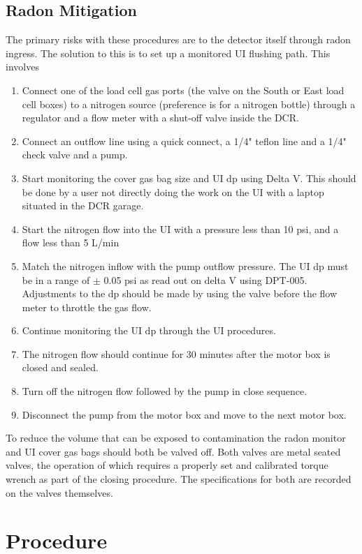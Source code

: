 \documentclass[11pt]{article}
\begin{document}
\subsection{Radon Mitigation}\label{ss:radmit}
The primary risks with these procedures are to the detector itself through radon ingress. The solution to this is to set up a monitored UI flushing path. This involves
	\begin{enumerate}
	\item Connect one of the load cell gas ports (the valve on the South or East load cell boxes) to a nitrogen source (preference is for a nitrogen bottle) through a regulator and a flow meter with a shut-off valve inside the DCR.
	\item Connect an outflow line using a quick connect, a 1/4" teflon line and a 1/4" check valve and a pump.
	\item Start monitoring the cover gas bag size and UI dp using Delta V. This should be done by a user not directly doing the work on the UI with a laptop situated in the DCR garage.
	\item Start the nitrogen flow into the UI with a pressure less than 10 psi, and a flow less than 5 L/min
	\item Match the nitrogen inflow with the pump outflow pressure. The UI dp must be in a range of $\pm$ 0.05 psi as read out on delta V using DPT-005. Adjustments to the dp should be made by using the valve before the flow meter to throttle the gas flow.
	\item Continue monitoring the UI dp through the UI procedures.
	\item The nitrogen flow should continue for 30 minutes after the motor box is closed and sealed.
	\item Turn off the nitrogen flow followed by the pump in close sequence.
	\item Disconnect the pump from the motor box and move to the next motor box. 
	\end{enumerate}
To reduce the volume that can be exposed to contamination the radon monitor and UI cover gas bags should both be valved off. Both valves are metal seated valves, the operation of which requires a properly set and calibrated torque wrench as part of the closing procedure. The specifications for both are recorded on the valves themselves. 


\section{Procedure}
\end{document}
